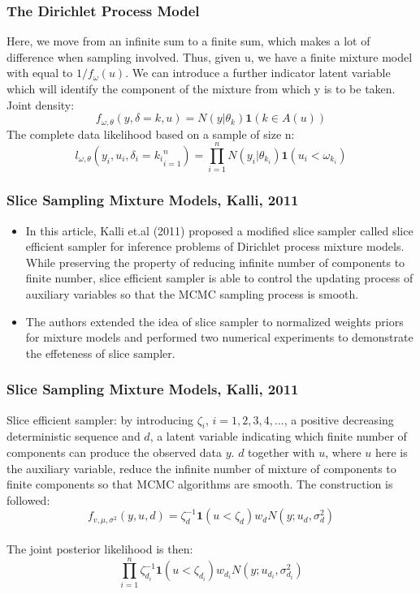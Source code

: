 \documentclass{beamer}
\begin{document}
\begin{frame}
    \frametitle{The Dirichlet Process Model}
    Here, we move from an infinite sum to a finite sum, which makes a lot of difference when sampling involved.
    \newline
    Thus, given u, we have a finite mixture model with equal to $1/f_\omega(u)$. 
    \newline
    We can introduce a further indicator latent variable which will identify the component of the mixture from which y is to be taken.
    Joint density:
    \begin{equation*}
    f_{\omega, \theta}(y,\delta=k, u) = N(y|\theta_k)\textbf{1}(k\in A(u))
    \end{equation*}
    The complete data likelihood based on a sample of size n:
    \begin{equation*}
    l_{\omega, \theta}({y_i, u_i, \delta_i = k_i}_{i=1}^n)=\prod_{i=1}^n N(y_i|\theta_{k_i})\textbf{1}(u_i<\omega_{k_i})
    \end{equation*}
\end{frame}




\begin{frame}
    \frametitle{Slice Sampling Mixture Models, Kalli, 2011}
    \begin{itemize}
        \item In this article, Kalli et.al (2011) proposed a modified slice sampler called slice efficient sampler for inference problems of Dirichlet process mixture models. While preserving the property of reducing infinite number of components to finite number, slice efficient sampler is able to control the updating process of  auxiliary variables so that the MCMC sampling process is smooth.
        \item The authors extended the idea of slice sampler to normalized weights priors for mixture models and performed two numerical experiments to demonstrate the effeteness of slice sampler.
    \end{itemize}
\end{frame}


\begin{frame}
    \frametitle{Slice Sampling Mixture Models, Kalli, 2011}
        Slice efficient sampler: by introducing $\zeta_i$, $i=1,2,3,4,...$, a positive decreasing deterministic sequence and $d$, a latent variable indicating which finite number of components can produce the observed data $y$. $d$ together with $u$, where $u$ here is the auxiliary variable, reduce the infinite number of mixture of components to finite components so that MCMC algorithms are smooth. The construction is followed:\\
        $$
        f_{v,\mu,\sigma^2}(y,u, d) = \zeta^{-1}_d \textbf{1}(u < \zeta_{d}) w_d N(y;u_d, \sigma^2_d)
        $$\\
        The joint posterior likelihood is then:
        $$
        \prod_{i=1}^n \zeta^{-1}_{d_i} \textbf{1}(u < \zeta_{d_i}) w_{d_i} N(y;u_{d_i}, \sigma^2_{d_i})
        $$
\end{frame}
\end{document}
